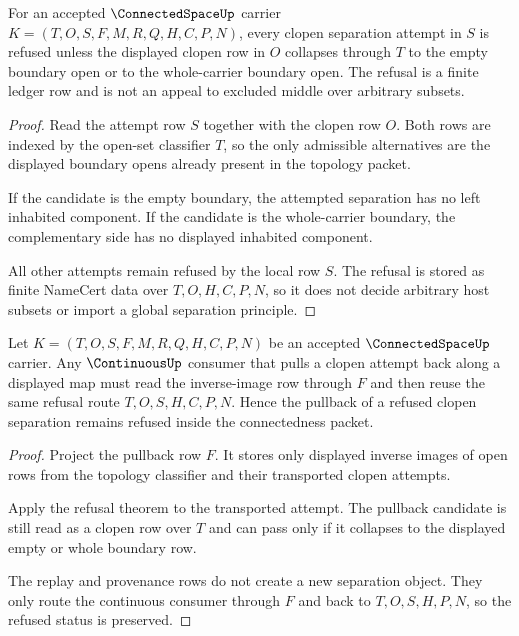 \begin{theorem}
\label{thm:connected-space-clopen-separation-refusal}
For an accepted $\ConnectedSpaceUp$ carrier $K=(T,O,S,F,M,R,Q,H,C,P,N)$, every clopen separation attempt in $S$ is refused unless the displayed clopen row in $O$ collapses through $T$ to the empty boundary open or to the whole-carrier boundary open. The refusal is a finite ledger row and is not an appeal to excluded middle over arbitrary subsets.
\end{theorem}
\begin{proof}
Read the attempt row $S$ together with the clopen row $O$. Both rows are indexed by the open-set classifier $T$, so the only admissible alternatives are the displayed boundary opens already present in the topology packet.

If the candidate is the empty boundary, the attempted separation has no left inhabited component. If the candidate is the whole-carrier boundary, the complementary side has no displayed inhabited component.

All other attempts remain refused by the local row $S$. The refusal is stored as finite NameCert data over $T,O,H,C,P,N$, so it does not decide arbitrary host subsets or import a global separation principle.
\end{proof}

\begin{theorem}
\label{thm:connected-space-continuous-pullback-preservation}
Let $K=(T,O,S,F,M,R,Q,H,C,P,N)$ be an accepted $\ConnectedSpaceUp$ carrier. Any $\ContinuousUp$ consumer that pulls a clopen attempt back along a displayed map must read the inverse-image row through $F$ and then reuse the same refusal route $T,O,S,H,C,P,N$. Hence the pullback of a refused clopen separation remains refused inside the connectedness packet.
\end{theorem}
\begin{proof}
Project the pullback row $F$. It stores only displayed inverse images of open rows from the topology classifier and their transported clopen attempts.

Apply the refusal theorem to the transported attempt. The pullback candidate is still read as a clopen row over $T$ and can pass only if it collapses to the displayed empty or whole boundary row.

The replay and provenance rows do not create a new separation object. They only route the continuous consumer through $F$ and back to $T,O,S,H,P,N$, so the refused status is preserved.
\end{proof}

